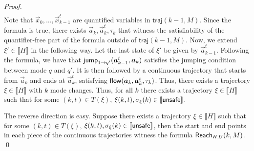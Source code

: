 \documentclass[10pt,envcountsect]{llncs}
\newcommand{\traj}{\mathsf{traj}}
\begin{document}
\begin{proof}
\begin{eqnarray*}
\end{eqnarray*}
Note that $\vec x_0,...,\vec x_{k-1}^t$ are quantified variables in $\traj(k-1,M)$. Since the formula is true, there exists $\vec a_{k}, \vec a_k^t, \tau_k$ that witness the satisfiability of the quantifier-free part of the formula outside of $\traj(k-1,M)$. Now, we extend $\xi'\in\llbracket H\rrbracket$ in the following way. Let the last state of $\xi'$ be given by $\vec a^t_{k-1}$. Following the formula, we have that $\jump_{1\rightarrow q'}(\vec a_{k-1}^t, \vec a_k)$ satisfies the jumping condition between mode $q$ and $q'$. It is then followed by a continuous trajectory that starts from $\vec a_k$ and ends at $\vec a_k^t$, satisfying $\flow(\vec a_k, \vec a_k^t, \tau_k)$. Thus, there exists a trajectory $\xi\in \llbracket H\rrbracket$ with $k$ mode changes. Thus, for all $k$ there exists a trajectory $\xi\in \llbracket H\rrbracket$ such that for some $(k,t)\in T(\xi)$, $\xi(k,t),\sigma_{\xi}(k)\in \llbracket \mathsf{unsafe}\rrbracket$.

The reverse direction is easy. Suppose there exists a trajectory $\xi\in \llbracket H\rrbracket$ such that for some $(k,t)\in T(\xi)$, $\xi(k,t),\sigma_{\xi}(k)\in \llbracket \mathsf{unsafe}\rrbracket$, then the start and end points in each piece of the continuous trajectories witness the formula $\mathsf{Reach}_{H,U}(k,M)$.
\qed

\end{proof}
\end{document}
